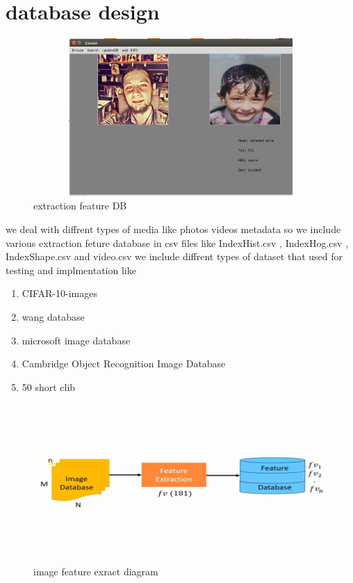 \documentclass[pdftex,10pt,a4paper,oneside]{article}
\begin{document}
\pagebreak
	\section{database design}
	\begin{figure}[H]
		\centering
		\includegraphics[width=120mm,height=60mm]{fig/18.png}
		\caption{extraction feature DB  }
		\label{extraction feature DB }
	\end{figure}
	we deal with diffrent types of media like photos videos metadata 
	so we include various extraction feture database in csv files like IndexHist.csv , IndexHog.csv , IndexShape.csv and video.csv
	we include diffrent types of dataset that used for testing and implmentation like 
	\begin{enumerate}
		\item CIFAR-10-images
		\item wang database
		\item microsoft image database
		\item Cambridge Object Recognition Image Database 
		\item 50 short clib
	\end{enumerate} 
\begin{figure}[H]
	\centering
	\includegraphics[width=120mm,height=60mm]{fig/21.png}
	\caption{image feature exract diagram }
	\label{image feature exract diagram}
\end{figure}
\end{document}
